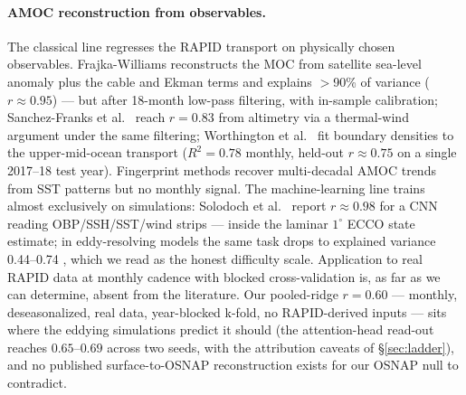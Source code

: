 \documentclass[10pt]{article}
\begin{document}
\paragraph{AMOC reconstruction from observables.} The classical line
regresses the RAPID transport on physically chosen observables.
Frajka-Williams \cite{fw2015} reconstructs the MOC from satellite
sea-level anomaly plus the cable and Ekman terms and explains
$>$90\% of variance ($r\approx0.95$) --- but after 18-month low-pass
filtering, with in-sample calibration; Sanchez-Franks et al.\
\cite{sf2021} reach $r=0.83$ from altimetry via a thermal-wind
argument under the same filtering; Worthington et al.\ \cite{worthington}
fit boundary densities to the upper-mid-ocean transport ($R^2=0.78$
monthly, held-out $r\approx0.75$ on a single 2017--18 test year).
Fingerprint methods \cite{caesar} recover multi-decadal AMOC trends
from SST patterns but no monthly signal. The machine-learning line
trains almost exclusively on simulations: Solodoch et al.\
\cite{solodoch} report $r\approx0.98$ for a CNN reading OBP/SSH/SST/wind
strips --- inside the laminar $1^\circ$ ECCO state estimate; in
eddy-resolving models the same task drops to explained variance
0.44--0.74 \cite{meng,woelker}, which we read as the honest difficulty
scale. Application to real RAPID data at monthly cadence with blocked
cross-validation is, as far as we can determine, absent from the
literature. Our pooled-ridge $r=0.60$ --- monthly, deseasonalized, real
data, year-blocked k-fold, no RAPID-derived inputs --- sits where the
eddying simulations predict it should (the attention-head read-out
reaches $0.65$--$0.69$ across two seeds, with the attribution caveats
of \S\ref{sec:ladder}), and no published surface-to-OSNAP
reconstruction exists for our OSNAP null to contradict.
\end{document}
